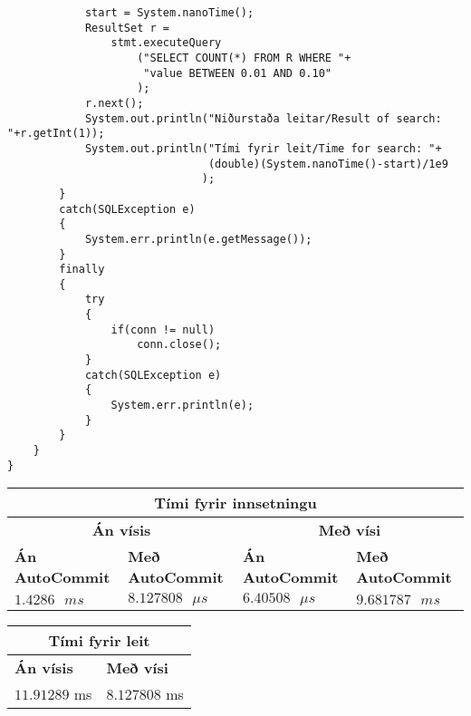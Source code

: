 \documentclass{article}
\begin{document}
\begin{verbatim}
            start = System.nanoTime();
            ResultSet r =
                stmt.executeQuery
                    ("SELECT COUNT(*) FROM R WHERE "+
                     "value BETWEEN 0.01 AND 0.10"
                    );
            r.next();
            System.out.println("Niðurstaða leitar/Result of search: "+r.getInt(1));
            System.out.println("Tími fyrir leit/Time for search: "+
                               (double)(System.nanoTime()-start)/1e9
                              );
        }
        catch(SQLException e)
        {
            System.err.println(e.getMessage());
        }
        finally
        {
            try
            {
                if(conn != null)
                    conn.close();
            }
            catch(SQLException e)
            {
                System.err.println(e);
            }
        }
    }
}
	\end{verbatim}
	\newpage
	\begin{center}
		\begin{tabular}{|l|l|l|l|}
			\hline
			\multicolumn{4}{|c|}{\textbf{Tími fyrir innsetningu}} \\
			\hline
			\multicolumn{2}{|c|}{\textbf{Án vísis}} & 
			\multicolumn{2}{c|}{\textbf{Með vísi}} \\
			\hline
			\textbf{Án AutoCommit} & \textbf{Með AutoCommit} & \textbf{Án AutoCommit} & \textbf{Með AutoCommit} \\
			\hline
			$1.4286\text{ }ms$ & $8.127808\text{ }\mu s$ &
			$6.40508\text{ }\mu s$ & $9.681787\text{ }ms$ \\
			\hline
		\end{tabular}
	\end{center}
	\begin{center}
		\begin{tabular}{|l|l|}
			\hline
			\multicolumn{2}{|c|}{\textbf{Tími fyrir leit}} \\
			\hline
			\textbf{Án vísis} & \textbf{Með vísi} \\
			\hline
			$11.91289$ ms & $8.127808$ ms \\

			\hline
		\end{tabular}
	\end{center}


	
\end{document}
